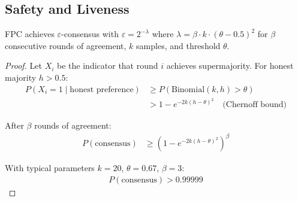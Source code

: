 \subsection{Safety and Liveness}

\begin{theorem}
\label{thm:safety}
FPC achieves $\varepsilon$-consensus with $\varepsilon = 2^{-\lambda}$ where $\lambda = \beta \cdot k \cdot (\theta - 0.5)^2$ for $\beta$ consecutive rounds of agreement, $k$ samples, and threshold $\theta$.
\end{theorem}

\begin{proof}
Let $X_i$ be the indicator that round $i$ achieves supermajority. For honest majority $h > 0.5$:
\begin{align}
P(X_i = 1 \mid \text{honest preference}) &\geq P(\text{Binomial}(k, h) > \theta) \\
&> 1 - e^{-2k(h-\theta)^2} \quad \text{(Chernoff bound)}
\end{align}

After $\beta$ rounds of agreement:
\begin{align}
P(\text{consensus}) &\geq \left(1 - e^{-2k(h-\theta)^2}\right)^\beta
\end{align}

With typical parameters $k = 20$, $\theta = 0.67$, $\beta = 3$:
\begin{align}
P(\text{consensus}) > 0.99999
\end{align}
\end{proof}

